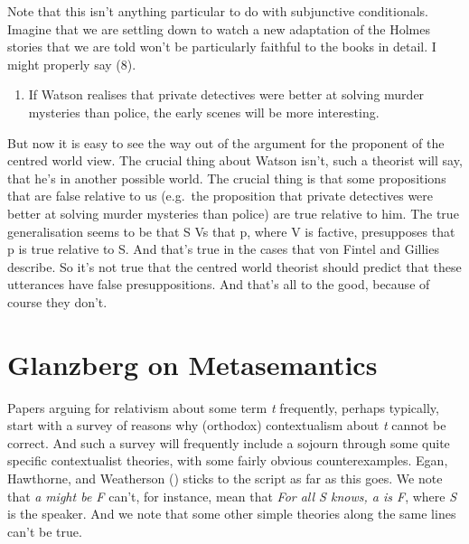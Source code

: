 \documentclass[
  11pt,
  letterpaper,
  DIV=11,
  numbers=noendperiod,
  twoside]{scrartcl}
\providecommand{\tightlist}{%
  \setlength{\itemsep}{0pt}\setlength{\parskip}{0pt}}
\begin{document}
Note that this isn't anything particular to do with subjunctive
conditionals. Imagine that we are settling down to watch a new
adaptation of the Holmes stories that we are told won't be particularly
faithful to the books in detail. I might properly say (8).

\begin{enumerate}
\def\labelenumi{\arabic{enumi}.}
\setcounter{enumi}{7}
\tightlist
\item
  If Watson realises that private detectives were better at solving
  murder mysteries than police, the early scenes will be more
  interesting.
\end{enumerate}

But now it is easy to see the way out of the argument for the proponent
of the centred world view. The crucial thing about Watson isn't, such a
theorist will say, that he's in another possible world. The crucial
thing is that some propositions that are false relative to us (e.g.~the
proposition that private detectives were better at solving murder
mysteries than police) are true relative to him. The true generalisation
seems to be that S Vs that p, where V is factive, presupposes that p is
true relative to S. And that's true in the cases that von Fintel and
Gillies describe. So it's not true that the centred world theorist
should predict that these utterances have false presuppositions. And
that's all to the good, because of course they don't.

\section{Glanzberg on Metasemantics}\label{glanzberg-on-metasemantics}

Papers arguing for relativism about some term \emph{t} frequently,
perhaps typically, start with a survey of reasons why (orthodox)
contextualism about \emph{t} cannot be correct. And such a survey will
frequently include a sojourn through some quite specific contextualist
theories, with some fairly obvious counterexamples. Egan, Hawthorne, and
Weatherson () sticks to the script
as far as this goes. We note that \emph{a} \emph{might be F} can't, for
instance, mean that \emph{For all S knows, a is F}, where \emph{S} is
the speaker. And we note that some other simple theories along the same
lines can't be true.
\end{document}
